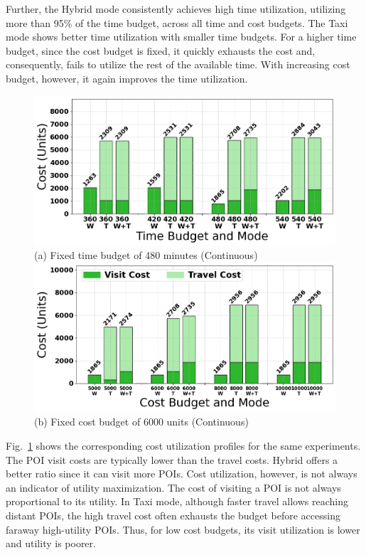 Further, the Hybrid mode consistently achieves high time utilization, utilizing more than 95\% of the time budget, across all time and cost budgets. 
The Taxi mode shows better time utilization with smaller time budgets. For a higher time budget, since the cost budget is fixed, it quickly exhausts the cost and, consequently, fails to utilize the rest of the available time.
With increasing cost budget, however, it again improves the time utilization.

\begin{figure}[t]
\centering
\includegraphics[width=\figwidth]{plots/cu5.png} \\
(a) Fixed time budget of 480 minutes (Continuous)
\includegraphics[width=\figwidth]{plots/CU1.png} \\
(b) Fixed cost budget of 6000 units (Continuous)
\label{fig:cost-utilization}
\end{figure}

Fig.~\ref{fig:cost-utilization} shows the corresponding cost utilization profiles for the same experiments.
The POI visit costs are typically lower than the travel costs.
Hybrid offers a better ratio since it can visit more POIs.
Cost utilization, however, is not always an indicator of utility maximization.
The cost of visiting a POI is not always proportional to its utility.
In Taxi mode, although faster travel allows reaching distant POIs, the high travel cost often exhausts the budget before accessing faraway high-utility POIs. Thus, for low cost budgets, its visit utilization is lower and utility is poorer.

